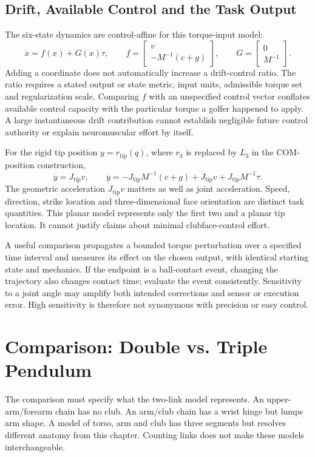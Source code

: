 \subsection{Drift, Available Control and the Task Output}
\label{constraint:triple_dcr_blowup}
The six-state dynamics are control-affine for this torque-input model:
\[
\dot x=f(x)+G(x)\tau,\qquad
f=\begin{bmatrix}v\\-M^{-1}(c+g)\end{bmatrix},\qquad
G=\begin{bmatrix}0\\M^{-1}\end{bmatrix}.
\]
Adding a coordinate does not automatically increase a drift-control ratio. The ratio requires a stated output or state metric, input units, admissible torque set and regularization scale. Comparing $f$ with an unspecified control vector conflates available control capacity with the particular torque a golfer happened to apply. A large instantaneous drift contribution cannot establish negligible future control authority or explain neuromuscular effort by itself.

For the rigid tip position $y=r_{\mathrm{tip}}(q)$, where $r_3$ is replaced by $L_3$ in the COM-position construction,
\[
\dot y=J_{\mathrm{tip}}v,\qquad
\ddot y=-J_{\mathrm{tip}}M^{-1}(c+g)+\dot J_{\mathrm{tip}}v
+J_{\mathrm{tip}}M^{-1}\tau.
\]
The geometric acceleration $\dot J_{\mathrm{tip}}v$ matters as well as joint acceleration. Speed, direction, strike location and three-dimensional face orientation are distinct task quantities. This planar model represents only the first two and a planar tip location. It cannot justify claims about minimal clubface-control effort.

A useful comparison propagates a bounded torque perturbation over a specified time interval and measures its effect on the chosen output, with identical starting state and mechanics. If the endpoint is a ball-contact event, changing the trajectory also changes contact time; evaluate the event consistently. Sensitivity to a joint angle may amplify both intended corrections and sensor or execution error. High sensitivity is therefore not synonymous with precision or easy control.

\section{Comparison: Double vs. Triple Pendulum}
\label{sec:double_vs_triple_pendulum}
\label{ex:dcr_double_vs_triple}
The comparison must specify what the two-link model represents. An upper-arm/forearm chain has no club. An arm/club chain has a wrist hinge but lumps arm shape. A model of torso, arm and club has three segments but resolves different anatomy from this chapter. Counting links does not make these models interchangeable.

